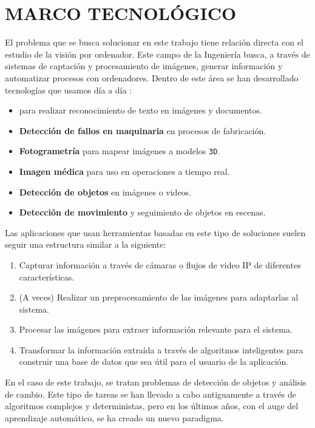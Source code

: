\section{MARCO TECNOLÓGICO}

El problema que se busca solucionar en este trabajo tiene relación directa con el estudio de la visión por ordenador. Este campo de la Ingeniería busca, 
a través de sistemas de captación y procesamiento de imágenes, generar información y automatizar procesos con ordenadores. \newline Dentro de este área se han desarrollado tecnologías que usamos día a día
\cite{szeliskiComputerVisionAlgorithms2022}:

\begin{itemize}
    \item \textbf{\textit{}} para realizar reconocimiento de texto en imágenes y documentos.
    \item \textbf{Detección de fallos en maquinaria} en procesos de fabricación.
    \item \textbf{Fotogrametría} para mapear imágenes a modelos \texttt{3D}.
    \item \textbf{Imagen médica} para uso en operaciones a tiempo real\cite{NEMESIS3DCM}.
    \item \textbf{Detección de objetos} en imágenes o videos.
    \item \textbf{Detección de movimiento} y seguimiento de objetos en escenas.
\end{itemize}

Las aplicaciones que usan herramientas basadas en este tipo de soluciones suelen seguir una estructura similar a la siguiente:

\begin{enumerate}
    \item Capturar información a través de cámaras o flujos de video IP de diferentes características.
    \item (A veces) Realizar un preprocesamiento de las imágenes para adaptarlas al sistema.
    \item Procesar las imágenes para extraer información relevante para el sistema.
    \item Transformar la información extraída a través de algoritmos inteligentes para construir una base de datos que sea útil para el usuario de la aplicación.
\end{enumerate}

En el caso de este trabajo, se tratan problemas de detección de objetos y análisis de cambio. Este tipo de tareas se han llevado a cabo antiguamente a través de algoritmos complejos y deterministas, pero en los últimos 
años, con el auge del aprendizaje automático, se ha creado un nuevo paradigma.

